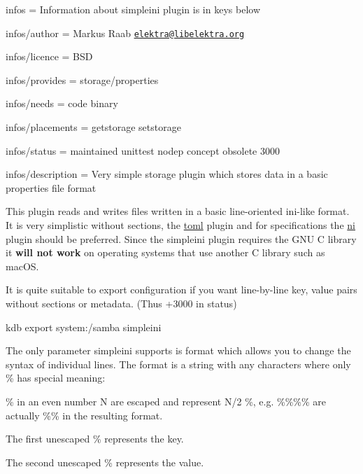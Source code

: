 
\begin{DoxyItemize}
\item infos = Information about simpleini plugin is in keys below
\item infos/author = Markus Raab \href{mailto:elektra@libelektra.org}{\tt elektra@libelektra.\+org}
\item infos/licence = B\+SD
\item infos/provides = storage/properties
\item infos/needs = code binary
\item infos/placements = getstorage setstorage
\item infos/status = maintained unittest nodep concept obsolete 3000
\item infos/description = Very simple storage plugin which stores data in a basic properties file format
\end{DoxyItemize}

This plugin reads and writes files written in a basic line-\/oriented ini-\/like format. It is very simplistic without sections, the \hyperlink{autotoc_md642_src_plugins_toml_README_md}{toml} plugin and for specifications the \hyperlink{autotoc_md475_src_plugins_ni_README_md}{ni} plugin should be preferred. Since the {\ttfamily simpleini} plugin requires the G\+NU C library it {\bfseries will not work} on operating systems that use another C library such as mac\+OS.

It is quite suitable to export configuration if you want line-\/by-\/line key, value pairs without sections or metadata. (Thus +3000 in status)


\begin{DoxyCode}
kdb export system:/samba simpleini
\end{DoxyCode}


The only parameter simpleini supports is {\ttfamily format} which allows you to change the syntax of individual lines. The {\ttfamily format} is a string with any characters where only {\ttfamily \%} has special meaning\+:


\begin{DoxyItemize}
\item {\ttfamily \%} in an even number N are escaped and represent N/2 {\ttfamily \%}, e.\+g. {\ttfamily \%\%\%\%} are actually {\ttfamily \%\%} in the resulting format.
\item The first unescaped {\ttfamily \%} represents the key.
\item The second unescaped {\ttfamily \%} represents the value.
\end{DoxyItemize}

